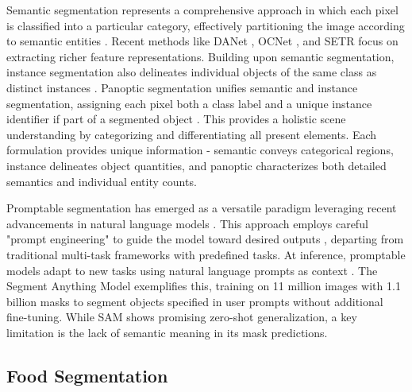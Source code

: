 \documentclass[lettersize,journal]{IEEEtran}
\begin{document}
Semantic segmentation represents a comprehensive approach in which each pixel is classified into a particular category, 
effectively partitioning the image according to semantic entities \cite{guo2018review, wang2018understanding, hao2020brief}. 
Recent methods like DANet \cite{fu2019dual}, OCNet \cite{yuan2018ocnet}, and SETR \cite{zheng2021rethinking} focus on extracting richer feature representations. 
Building upon semantic segmentation, instance segmentation \cite{hafiz2020survey} also delineates individual objects of the same class as distinct instances \cite{he2017mask,bolya2019yolact}. 
Panoptic segmentation unifies semantic and instance segmentation, 
assigning each pixel both a class label and a unique instance identifier if part of a segmented object \cite{kirillov2019panoptic, xiong2019upsnet, elharrouss2021panoptic}. 
This provides a holistic scene understanding by categorizing and differentiating all present elements. 
Each formulation provides unique information - semantic conveys categorical regions, instance delineates object quantities, 
and panoptic characterizes both detailed semantics and individual entity counts. 

Promptable segmentation has emerged as a versatile paradigm leveraging recent advancements in natural language models \cite{liu2023pre, luddecke2022image}. 
This approach employs careful "prompt engineering" to guide the model toward desired outputs \cite{liu2021gpt, lu2021pretrained}, 
departing from traditional multi-task frameworks with predefined tasks. 
At inference, promptable models adapt to new tasks using natural language prompts as context \cite{liu2023pre}. 
The Segment Anything Model \cite{kirillov2023segment} exemplifies this, 
training on 11 million images with 1.1 billion masks to segment objects specified in user prompts without additional fine-tuning. 
While SAM shows promising zero-shot generalization, a key limitation is the lack of semantic meaning in its mask predictions. 

\subsection{Food Segmentation}
\end{document}
